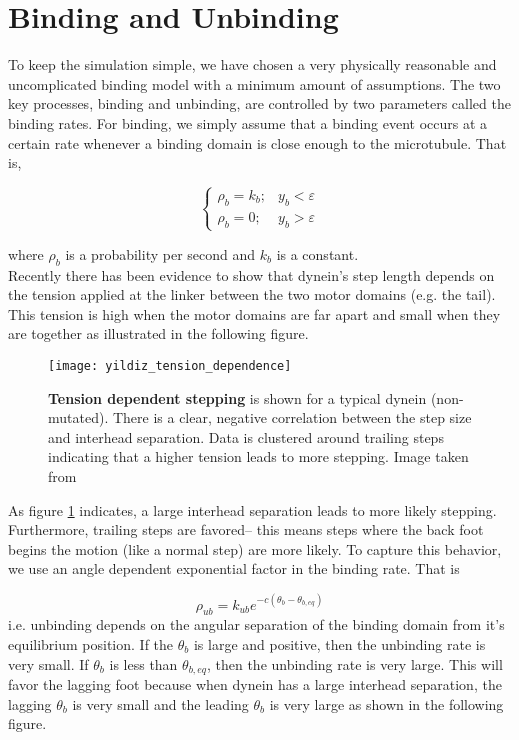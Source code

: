 	\section{Binding and Unbinding}
	To keep the simulation simple, we have chosen a very physically reasonable and uncomplicated binding model with a minimum amount of assumptions. The two key processes, binding and unbinding, are controlled by two parameters called the binding rates. For binding, we simply assume that a binding event occurs at a certain rate whenever a binding domain is close enough to the microtubule. That is, 
	
	\begin{equation}
	\begin{cases}
		\rho_{b} = k_b; & y_b < \varepsilon \\ 
		\rho_{b} = 0; & y_b > \varepsilon
	\end{cases}
	\end{equation}
	
	where $\rho_b$ is a probability per second and $k_b$ is a constant. \\
	
	Recently there has been evidence to show that dynein's step length depends on the tension applied at the linker between the two motor domains (e.g. the tail).\cite{cleary2014tension} This tension is high when the motor domains are far apart and small when they are together as illustrated in the following figure. \\
	\begin{figure}[!hbt]
		\centering
		\texttt{[image: yildiz\_tension\_dependence]}
		\caption{\textbf{Tension dependent stepping} is shown for a typical dynein (non-mutated). There is a clear, negative correlation between the step size and interhead separation. Data is clustered around trailing steps indicating that a higher tension leads to more stepping. Image taken from \cite{cleary2014tension}}
		\label{fig:yildiz_tension}
	\end{figure} 	
	As figure \ref{fig:yildiz_tension} indicates, a large interhead separation leads to more likely stepping. Furthermore, trailing steps are favored-- this means steps where the back foot begins the motion (like a normal step) are more likely. To capture this behavior, we use an angle dependent exponential factor in the binding rate. That is 
	
	
	
	\begin{equation}
	\rho_{ub} = k_{ub}e^{-c(\theta_b-\theta_{b,eq})}
	\end{equation}
	i.e. unbinding depends on the angular separation of the binding domain from it's equilibrium position. If the $\theta_b$ is large and positive, then the unbinding rate is very small. If $\theta_b$ is less than $\theta_{b,eq}$, then the unbinding rate is very large. This will favor the lagging foot because when dynein has a large interhead separation, the lagging $\theta_b$ is very small and the leading $\theta_b$ is very large as shown in the following figure. 
	
